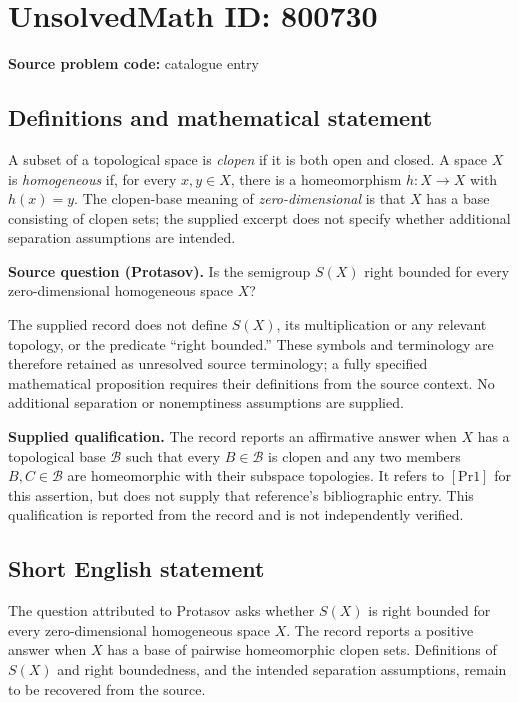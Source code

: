 \documentclass[11pt]{article}
\begin{document}
\section*{UnsolvedMath ID: 800730}
\textbf{Source problem code:} catalogue entry
\subsection{Definitions and mathematical statement}
A subset of a topological space is \emph{clopen} if it is both open and closed. A space \(X\) is \emph{homogeneous} if, for every \(x,y\in X\), there is a homeomorphism \(h:X\to X\) with \(h(x)=y\). The clopen-base meaning of \emph{zero-dimensional} is that \(X\) has a base consisting of clopen sets; the supplied excerpt does not specify whether additional separation assumptions are intended.

\textbf{Source question (Protasov).} Is the semigroup \(S(X)\) right bounded for every zero-dimensional homogeneous space \(X\)?

The supplied record does not define \(S(X)\), its multiplication or any relevant topology, or the predicate ``right bounded.'' These symbols and terminology are therefore retained as unresolved source terminology; a fully specified mathematical proposition requires their definitions from the source context. No additional separation or nonemptiness assumptions are supplied.

\textbf{Supplied qualification.} The record reports an affirmative answer when \(X\) has a topological base \(\mathcal B\) such that every \(B\in\mathcal B\) is clopen and any two members \(B,C\in\mathcal B\) are homeomorphic with their subspace topologies. It refers to \([\mathrm{Pr1}]\) for this assertion, but does not supply that reference's bibliographic entry. This qualification is reported from the record and is not independently verified.
\subsection{Short English statement}
The question attributed to Protasov asks whether \(S(X)\) is right bounded for every zero-dimensional homogeneous space \(X\). The record reports a positive answer when \(X\) has a base of pairwise homeomorphic clopen sets. Definitions of \(S(X)\) and right boundedness, and the intended separation assumptions, remain to be recovered from the source.
\end{document}
